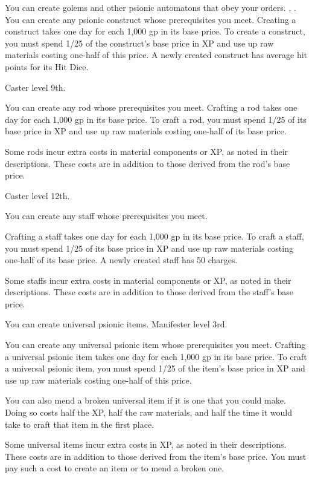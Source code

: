 {You can create golems and other psionic automatons that obey your orders.}
{, .}
{You can create any psionic construct whose prerequisites you meet. Creating a construct takes one day for each 1,000 gp in its base price. To create a construct, you must spend 1/25 of the construct’s base price in XP and use up raw materials costing one-half of this price. A newly created construct has average hit points for its Hit Dice.}{}{}

{Caster level 9th.}
{You can create any rod whose prerequisites you meet. Crafting a rod takes one day for each 1,000 gp in its base price. To craft a rod, you must spend 1/25 of its base price in XP and use up raw materials costing one-half of its base price.

Some rods incur extra costs in material components or XP, as noted in their descriptions. These costs are in addition to those derived from the rod’s base price.}

{Caster level 12th.}
{You can create any staff whose prerequisites you meet.

Crafting a staff takes one day for each 1,000 gp in its base price. To craft a staff, you must spend 1/25 of its base price in XP and use up raw materials costing one-half of its base price. A newly created staff has 50 charges.

Some staffs incur extra costs in material components or XP, as noted in their descriptions. These costs are in addition to those derived from the staff’s base price.}

{You can create universal psionic items.}
{Manifester level 3rd.}
{You can create any universal psionic item whose prerequisites you meet. Crafting a universal psionic item takes one day for each 1,000 gp in its base price. To craft a universal psionic item, you must spend 1/25 of the item’s base price in XP and use up raw materials costing one-half of this price.

You can also mend a broken universal item if it is one that you could make. Doing so costs half the XP, half the raw materials, and half the time it would take to craft that item in the first place.

Some universal items incur extra costs in XP, as noted in their descriptions. These costs are in addition to those derived from the item’s base price. You must pay such a cost to create an item or to mend a broken one.}{}{}


